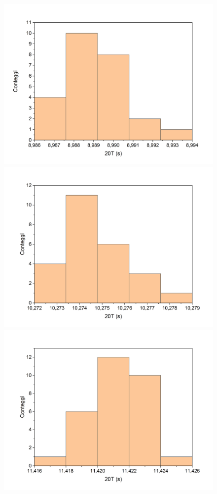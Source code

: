 \documentclass{article}
\begin{document}
\begin{figure}[h]
    \includegraphics[width=\textwidth]{Dinamico1.jpg}
    \includegraphics[width=\textwidth]{Dinamico2.jpg}
    \includegraphics[width=\textwidth]{Dinamico3.jpg}

\end{figure}
\end{document}
